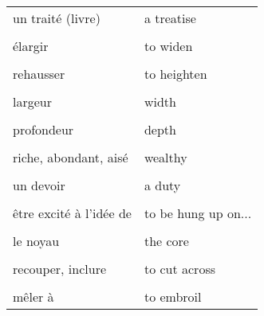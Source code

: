 \documentclass[
  10pt,
]{article}
\begin{document}
\begin{longtable}{ll}
un traité (livre) & a treatise\\

\cellcolor{gray!6}{vendre la mèche} & \cellcolor{gray!6}{to spill the beans}\\

élargir & to widen\\

\cellcolor{gray!6}{approfondir} & \cellcolor{gray!6}{to deepen}\\

rehausser & to heighten\\

\cellcolor{gray!6}{allonger} & \cellcolor{gray!6}{to lengthen}\\

largeur & width\\

\cellcolor{gray!6}{longueur} & \cellcolor{gray!6}{length}\\

profondeur & depth\\

\cellcolor{gray!6}{hauteur} & \cellcolor{gray!6}{height}\\

riche, abondant, aisé & wealthy\\

\cellcolor{gray!6}{concret} & \cellcolor{gray!6}{hands-on}\\

un devoir & a duty\\

\cellcolor{gray!6}{la sagesse} & \cellcolor{gray!6}{wisdom}\\

être excité à l'idée de & to be hung up on...\\

\cellcolor{gray!6}{l'état-providence} & \cellcolor{gray!6}{the welfare state}\\

le noyau & the core\\

\cellcolor{gray!6}{une revendication} & \cellcolor{gray!6}{a claim}\\

recouper, inclure & to cut across\\

\cellcolor{gray!6}{un festin} & \cellcolor{gray!6}{a feast}\\

mêler à & to embroil\\


\end{longtable}
\end{document}
